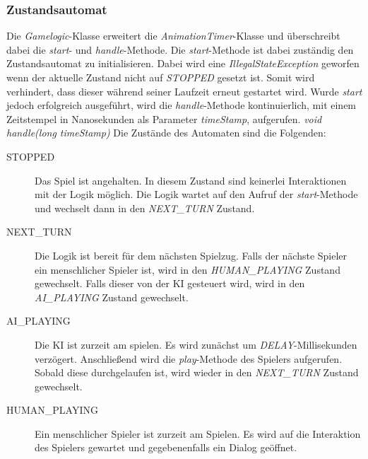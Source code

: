             \subsubsection{Zustandsautomat}
                Die \textit{Gamelogic}-Klasse erweitert die \textit{AnimationTimer}-Klasse und überschreibt dabei
                die \textit{start}- und \textit{handle}-Methode.
                Die \textit{start}-Methode ist dabei zuständig den Zustandsautomat zu initialisieren. Dabei wird eine \textit{IllegalStateException}
                geworfen wenn der aktuelle Zustand nicht auf \textit{STOPPED} gesetzt ist. Somit wird verhindert, dass dieser während seiner Laufzeit
                erneut gestartet wird.
                Wurde \textit{start} jedoch erfolgreich ausgeführt, wird die \textit{handle}-Methode kontinuierlich, mit einem Zeitstempel
                in Nanosekunden als Parameter \textit{timeStamp}, aufgerufen.
                \newline
                \newline
                \textit{void handle(long timeStamp)}
                \newline
                \newline
                Die Zustände des Automaten sind die Folgenden:
                \begin{description}
                    \item[STOPPED] Das Spiel ist angehalten. In diesem Zustand sind keinerlei Interaktionen mit der Logik möglich.
                                    Die Logik wartet auf den Aufruf der \textit{start}-Methode und wechselt dann in den \textit{NEXT\_TURN} Zustand.
                    \item[NEXT\_TURN] Die Logik ist bereit für dem nächsten Spielzug. Falls der nächste Spieler ein menschlicher Spieler ist,
                                        wird in den \textit{HUMAN\_PLAYING} Zustand gewechselt. Falls dieser von der KI gesteuert wird, wird in den \textit{AI\_PLAYING}
                                        Zustand gewechselt.
                    \item[AI\_PLAYING] Die KI ist zurzeit am spielen. Es wird zunächst um \textit{DELAY}-Millisekunden verzögert.
                                        Anschließend wird die \textit{play}-Methode des Spielers aufgerufen. Sobald diese durchgelaufen ist, wird wieder
                                        in den \textit{NEXT\_TURN} Zustand gewechselt.
                    \item[HUMAN\_PLAYING] Ein menschlicher Spieler ist zurzeit am Spielen. Es wird auf die Interaktion des Spielers gewartet und gegebenenfalls 
                                            ein Dialog geöffnet. 
                \end{description}

